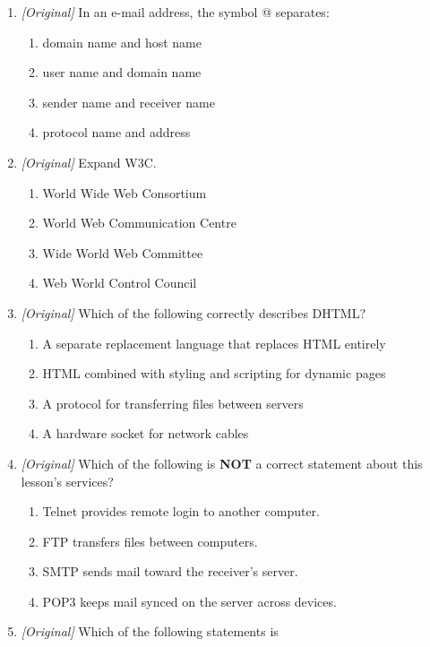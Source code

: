 \documentclass[11pt]{article}
\begin{document}
\begin{enumerate}[label=\textbf{Q\arabic*.}, leftmargin=*]
\begin{enumerate}[label=\Alph*.]
    \item IMAP
  \end{enumerate}
\item \textit{[Original]} In an e-mail address, the symbol @ separates:
  \begin{enumerate}[label=\Alph*.]
    \item domain name and host name
    \item user name and domain name
    \item sender name and receiver name
    \item protocol name and address
  \end{enumerate}
\item \textit{[Original]} Expand W3C.
  \begin{enumerate}[label=\Alph*.]
    \item World Wide Web Consortium
    \item World Web Communication Centre
    \item Wide World Web Committee
    \item Web World Control Council
  \end{enumerate}
\item \textit{[Original]} Which of the following correctly describes DHTML?
  \begin{enumerate}[label=\Alph*.]
    \item A separate replacement language that replaces HTML entirely
    \item HTML combined with styling and scripting for dynamic pages
    \item A protocol for transferring files between servers
    \item A hardware socket for network cables
  \end{enumerate}
\item \textit{[Original]} Which of the following is \textbf{NOT} a correct
  statement about this lesson's services?
  \begin{enumerate}[label=\Alph*.]
    \item Telnet provides remote login to another computer.
    \item FTP transfers files between computers.
    \item SMTP sends mail toward the receiver's server.
    \item POP3 keeps mail synced on the server across devices.
  \end{enumerate}
\item \textit{[Original]} Which of the following statements is

\end{enumerate}
\end{document}
